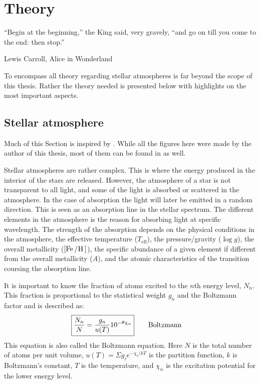\chapter{Theory}
\label{cha:theory}

\epigraph{``Begin at the beginning,'' the King said, very gravely, ``and go on till you come to the
          end: then stop.''}{Lewis Carroll, Alice in Wonderland}

To encompass all theory regarding stellar atmospheres is far beyond the scope of this thesis. Rather
the theory needed is presented below with highlights on the most important aspects.


\section{Stellar atmosphere}
\label{sec:stellar_atmosphere}

Much of this Section is inspired by \citet{Gray2006}. While all the figures here were made by the
author of this thesis, most of them can be found in \citet{Gray2006} as well.

Stellar atmospheres are rather complex. This is where the energy produced in the interior of the
stars are released. However, the atmosphere of a star is not transparent to all light, and some of
the light is absorbed or scattered in the atmosphere. In the case of absorption the light will later
be emitted in a random direction. This is seen as an absorption line in the stellar spectrum. The
different elements in the atmosphere is the reason for absorbing light at specific wavelength. The
strength of the absorption depends on the physical conditions in the atmosphere, the effective
temperature ($T_\mathrm{eff}$), the pressure/gravity ($\log g$), the overall metallicity
($[\ion{Fe}/\ion{H}]$), the specific abundance of a given element if different from the overall
metallicity ($A$), and the atomic characteristics of the transition coursing the absorption line.

It is important to know the fraction of atoms excited to the $n$th energy level, $N_n$. This
fraction is proportional to the statistical weight $g_n$ and the Boltzmann factor and is described
as:
\begin{align}
    \Aboxed{ \frac{N_n}{N} = \frac{g_n}{u(T)} 10^{-\theta\chi_n}} \tag*{Boltzmann}
\end{align}
This equation is also called the Boltzmann equation. Here $N$ is the total number of atoms per unit
volume, $u(T)=\Sigma g_i e^{-\chi_i/kT}$ is the partition function, $k$ is Boltzmann's constant, $T$
is the temperature, and $\chi_n$ is the excitation potential for the lower energy level.

